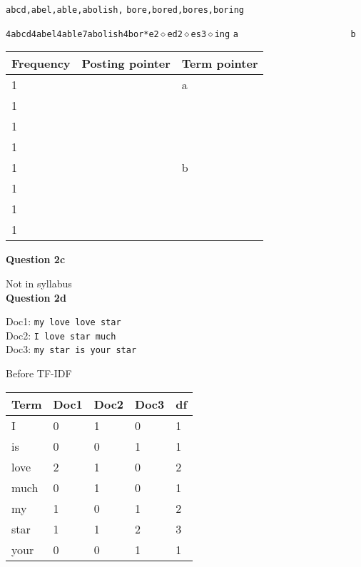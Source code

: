 \documentclass[11pt,a4paper]{report}
\begin{document}
\begin{multicols*}{2}
\begin{center}
\verb|abcd,abel,able,abolish,|
\verb|bore,bored,bores,boring|
\end{center}

\noindent \verb|4abcd4abel4able7abolish4bor*e2|$\diamond$\verb|ed2|$\diamond$\verb|es3|$\diamond$\verb|ing|
\noindent \verb|a                      b|

\begin{center}
\begin{tabular}{ | l | l | l |}
    \hline
    Frequency & Posting pointer & Term pointer \\
    \hline
    1 & & a \\
    1 & & \\
    1 & & \\
    1 & & \\
    1 & & b \\
    1 & & \\
    1 & & \\
    1 & & \\
    \hline
\end{tabular}
\end{center}

\noindent \textbf{Question 2c}

\noindent Not in syllabus\\

\noindent \textbf{Question 2d}

\begin{center}
Doc1: \verb|my love love star|\\
Doc2: \verb|I love star much|\\
Doc3: \verb|my star is your star|
\end{center}

\noindent Before TF-IDF
\begin{center}
\begin{tabular}{ | l | l l l |l|}
    \hline
    Term   & Doc1 & Doc2 & Doc3 & df \\
    \hline
    I      & 0    & 1    & 0    & 1  \\
    is     & 0    & 0    & 1    & 1  \\
    love   & 2    & 1    & 0    & 2  \\
    much   & 0    & 1    & 0    & 1  \\
    my     & 1    & 0    & 1    & 2  \\
    star   & 1    & 1    & 2    & 3  \\
    your   & 0    & 0    & 1    & 1  \\
    \hline
\end{tabular}
\end{center}


\end{multicols*}
\end{document}
